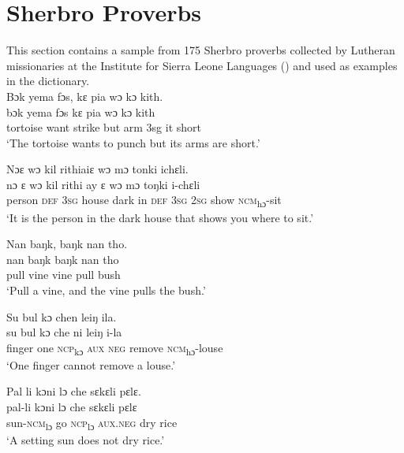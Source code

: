 \chapter{Sherbro Proverbs}
\label{app:c}\hypertarget{Toc115517829}{}
This section contains a sample from 175 Sherbro proverbs collected by Lutheran missionaries at the Institute for Sierra Leone Languages (\cite{TISLL1979}) and used as examples in the dictionary.\\


\ea%
\label{ex:250}
Bɔk yema fɔs, kɛ pia wɔ kɔ kith.\\
\gll bɔk    yema    fɔs      kɛ    pia  wɔ    kɔ    kith\\
tortoise  want    strike    but  arm  3sg  it    short\\
\glt ‘The tortoise wants to punch but its arms are short.'
\z

\ea%
\label{ex:251}
Nɔɛ wɔ kil rithiaiɛ wɔ mɔ tonki ichɛli.\\
\gll nɔ      ɛ    wɔ    kil      rithi  ay  ɛ    wɔ    mɔ  toŋki    i-chɛli\\
person  \textsc{def}  \textsc{3sg}  house    dark  in  \textsc{def}  \textsc{3sg}  \textsc{2sg}  show    \textsc{ncm}\textsubscript{hɔ}{}-sit\\
\glt ‘It is the person in the dark house that shows you where to sit.'
\z

\ea%
\label{ex:252}
Nan baŋk, baŋk nan tho.\\
\gll nan  baŋk  baŋk  nan  tho\\
pull  vine  vine  pull  bush\\
\glt ‘Pull a vine, and the vine pulls the bush.'
\z

\ea%
\label{ex:253}
Su bul kɔ chen leiŋ ila.\\
\gll su      bul  kɔ      che  ni    leiŋ    i-la\\
finger    one  \textsc{ncp}\textsubscript{kɔ}    \textsc{aux}  \textsc{neg}  remove  \textsc{ncm}\textsubscript{hɔ}{}-louse\\
\glt ‘One finger cannot remove a louse.'
\z

\ea%
\label{ex:254}
Pal li kɔni lɔ che sɛkɛli pɛlɛ.\\
\gll pal-li        kɔni    lɔ      che      sɛkɛli    pɛlɛ\\
sun-\textsc{ncm}\textsubscript{lɔ}    go      \textsc{ncp}\textsubscript{lɔ}    \textsc{aux.neg}    dry    rice\\
\glt ‘A setting sun does not dry rice.'
\z

